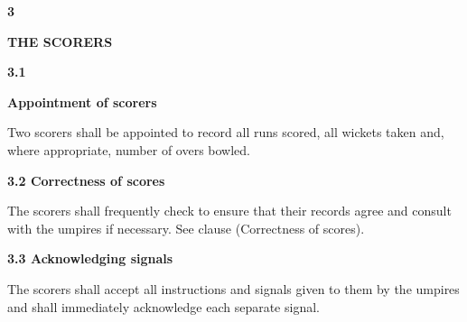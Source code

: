 \documentclass[12pt]{article}
\begin{document}
\vspace{\baselineskip}
{\fontsize{16pt}{19.2pt}\selectfont \textbf{3 \tabto{0.29in} }{\fontsize{15pt}{18.0pt}\selectfont \textbf{THE SCORERS}\par}\par}\par


\vspace{\baselineskip}
{\fontsize{11pt}{13.2pt}\selectfont \textbf{3.1 \tabto{0.47in} }{\fontsize{10pt}{12.0pt}\selectfont \textbf{Appointment of scorers}\par}\par}\par


\vspace{\baselineskip}
\begin{adjustwidth}{0.0in}{0.12in}
{\fontsize{9pt}{10.8pt}\selectfont Two scorers shall be appointed to record all runs scored, all wickets taken and, where appropriate, number of overs bowled.\par}\par

\end{adjustwidth}


\vspace{\baselineskip}
{\fontsize{11pt}{13.2pt}\selectfont \textbf{3.2 \tabto{0.47in} Correctness of scores}\par}\par


\vspace{\baselineskip}
\begin{adjustwidth}{0.0in}{0.11in}
{\fontsize{9pt}{10.8pt}\selectfont The scorers shall frequently check to ensure that their records agree and consult with the umpires if necessary. See clause (Correctness of scores).\par}\par

\end{adjustwidth}


\vspace{\baselineskip}
{\fontsize{11pt}{13.2pt}\selectfont \textbf{3.3 \tabto{0.47in} Acknowledging signals}\par}\par


\vspace{\baselineskip}
\begin{adjustwidth}{0.0in}{0.01in}
{\fontsize{9pt}{10.8pt}\selectfont The scorers shall accept all instructions and signals given to them by the umpires and shall immediately acknowledge each separate signal.\par}\par

\end{adjustwidth}
\end{document}
